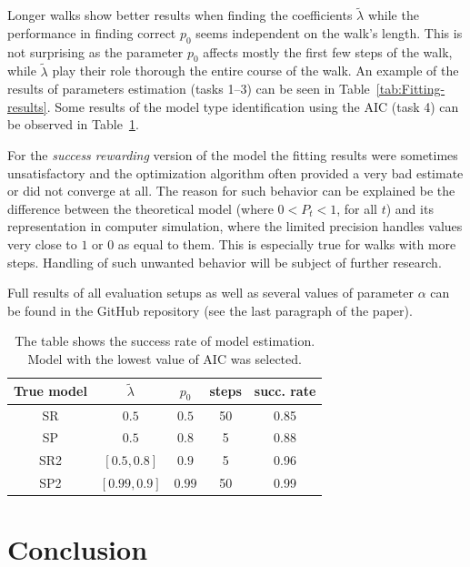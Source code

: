 \documentclass{amsart}
\theoremstyle{definition}
\theoremstyle{plain}
\theoremstyle{plain}
\theoremstyle{plain}
\numberwithin{equation}{section}
\begin{document}
    Longer walks show better results when finding the coefficients $\tilde{\lambda}$ while the performance in finding correct $p_0$ seems independent on the walk's length.
    This is not surprising as the parameter $p_0$ affects mostly the first few steps of the walk, while $\tilde{\lambda}$ play their role thorough the entire course of the walk.
    An example of the results of parameters estimation (tasks 1--3) can be seen in Table~\ref{tab:Fitting-results}.
    Some results of the model type identification using the AIC (task 4) can be observed in Table~\ref{tab:Fitting-results-model}.

    For the \emph{success rewarding} version of the model the fitting results were sometimes unsatisfactory and the optimization algorithm often provided a very bad estimate or did not converge at all.
    The reason for such behavior can be explained be the difference between the theoretical model (where $0<P_t<1$, for all $t$) and its representation in computer simulation, where the limited precision handles values very close to $1$ or $0$ as equal to them.
    This is especially true for walks with more steps.
    Handling of such unwanted behavior will be subject of further research.

    Full results of all evaluation setups as well as several values of parameter $\alpha$ can be found in the GitHub repository (see the last paragraph of the paper).

    \begin{table}
        \centering{}

        {\caption{\label{tab:Fitting-results-model}The table shows the success rate of model estimation.
        Model with the lowest value of AIC was selected.}
            \begin{tabular}{|c|c|c|c|c|}
                \hline
                True model & $\tilde{\lambda}$  & $p_0$  & steps & succ. rate \tabularnewline
                \hline
                SR & $0.5$  & $0.5$  & 50 & 0.85 \tabularnewline
                \hline
                SP & $0.5$  & $0.8$  & 5 & 0.88 \tabularnewline
                \hline
                SR2 & $[0.5,0.8]$  & $0.9$  & 5 & 0.96 \tabularnewline
                \hline
                SP2 & $[0.99,0.9]$  & $0.99$  & 50 & 0.99 \tabularnewline
                \hline
            \end{tabular}
        }
    \end{table}


    \section{Conclusion}\label{sec:Conclusion}
\end{document}
